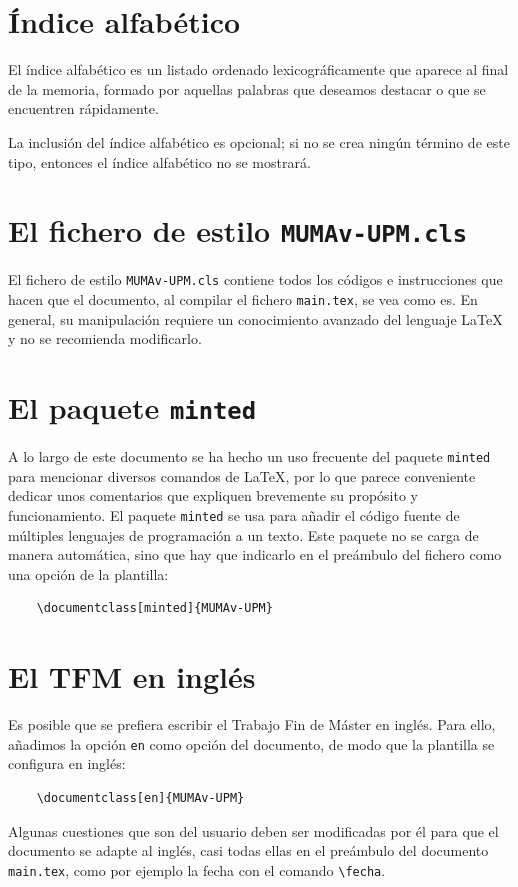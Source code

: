 \section{Índice alfabético}
\label{s:indice}

El índice alfabético es un listado ordenado lexicográficamente que aparece al final de la memoria, formado por aquellas palabras que deseamos destacar o que se encuentren rápidamente.

La inclusión del índice alfabético es opcional; si no se crea ningún término de este tipo, entonces el índice alfabético no se mostrará.


\section{El fichero de estilo \texttt{MUMAv-UPM.cls}}\label{s:estilo}
El fichero de estilo \texttt{MUMAv-UPM.cls} contiene todos los códigos e instrucciones que hacen que el documento, al compilar el fichero \texttt{main.tex}, se vea como es. En general, su manipulación requiere un conocimiento avanzado del lenguaje \LaTeX~  y no se recomienda modificarlo. 



\section{El paquete \texttt{minted}}\label{s:minted}

A lo largo de este documento se ha hecho un uso frecuente del paquete \texttt{minted} para mencionar diversos comandos de \LaTeX, por lo que parece conveniente dedicar unos comentarios que expliquen brevemente su propósito y funcionamiento. El paquete  \texttt{minted} se usa para añadir el código fuente de múltiples lenguajes de programación a un texto. Este paquete no se carga de manera automática, sino que hay que indicarlo en el preámbulo del fichero como una opción de la plantilla:
\begin{verbatim}
    \documentclass[minted]{MUMAv-UPM}
\end{verbatim}


\section{El TFM en inglés}\label{s:en}

Es posible que se prefiera escribir el Trabajo Fin de Máster en inglés. Para ello, añadimos la opción \texttt{en} como opción del documento, de modo que la plantilla se configura en inglés:
\begin{verbatim}
    \documentclass[en]{MUMAv-UPM}
\end{verbatim}

Algunas cuestiones que son del usuario deben ser modificadas por él para que el documento se adapte al inglés, casi todas ellas en el preámbulo del documento \texttt{main.tex}, como por ejemplo la fecha con el comando \verb+\fecha+.